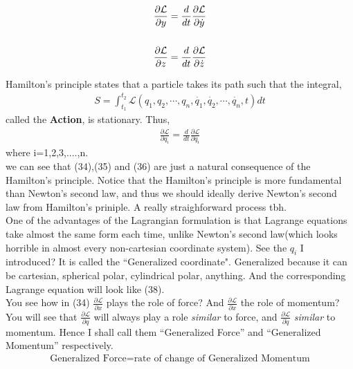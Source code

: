 \documentclass[12pt]{article}
\begin{document}
\begin{align}
    \frac{\partial \mathcal{L}}{\partial y}=\frac{d}{dt}\frac{\partial \mathcal{L}}{\partial \dot{y}} \\ \notag \\ \frac{\partial \mathcal{L}}{\partial z}=\frac{d}{dt}\frac{\partial \mathcal{L}}{\partial \dot{z}}
\end{align}

    Hamilton's principle states that a particle takes its path such that the integral,
    \begin{align}
        S=\int_{t_1}^{t_2}\mathcal{L}(q_1,q_2,\cdots,q_n,\dot{q_1},\dot{q_2},\cdots,\dot{q_n},t)dt
    \end{align}
    called the \textbf{Action}, is stationary. Thus,
    \begin{align}
        \frac{\partial \mathcal{L}}{\partial q_i}=\frac{d}{dt}\frac{\partial \mathcal{L}}{\partial \dot{q_i}} 
    \end{align}
    where i=1,2,3,....,n. \\
     we can see that (34),(35) and (36) are just a natural
    consequence of the Hamilton's principle. Notice that the Hamilton's principle is more fundamental than
    Newton's second law, and thus we should ideally derive Newton's second law from Hamilton's priniple. A really straighforward process tbh.
    \\
    One of the advantages of the Lagrangian formulation is that Lagrange equations take almost the same
    form each time, unlike Newton's second law(which looks horrible in almost every non-cartesian coordinate system).
    See the $q_i$ I introduced? It is called the ``Generalized coordinate". Generalized because it can be cartesian, spherical polar, cylindrical polar,
    anything. And the corresponding Lagrange equation will look like (38). \\
    You see how in (34) $\frac{\partial \mathcal{L}}{\partial x}$ plays the role of force? And $\frac{\partial \mathcal{L}}{\partial \dot{x}}$ the role of
    momentum? \\ You will see that $\frac{\partial \mathcal{L}}{\partial q}$ will always play a role \textit{similar} to force, and $\frac{\partial \mathcal{L}}{\partial \dot{q}}$ \textit{similar} to momentum.
    Hence I shall call them ``Generalized Force'' and ``Generalized Momentum'' respectively.
    \begin{align}
        \text{Generalized Force}=\text{rate of change of Generalized Momentum}
    \end{align}
\end{document}
